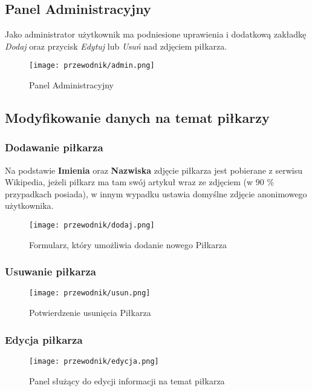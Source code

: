         \pagebreak

        \subsection{Panel Administracyjny}
            Jako administrator użytkownik ma podniesione uprawienia i dodatkową zakładkę \textit{Dodaj} oraz przycisk \textit{Edytuj} lub \textit{Usuń} nad zdjęciem piłkarza.

            \begin{figure}[!htb]
                \centering
                \texttt{[image: przewodnik/admin.png]}
                \caption{Panel Administracyjny}                
            \end{figure}

        \subsection{Modyfikowanie danych na temat piłkarzy}
                \subsubsection{Dodawanie piłkarza}
                 Na podstawie \textbf{Imienia} oraz \textbf{Nazwiska} zdjęcie piłkarza jest pobierane z serwisu Wikipedia, jeżeli piłkarz ma tam swój artykuł wraz ze zdjęciem (w 90 \% przypadkach posiada), w innym wypadku ustawia domyślne zdjęcie anonimowego użytkownika. 

                    \begin{figure}[!htb]
                        \centering
                        \texttt{[image: przewodnik/dodaj.png]}
                        \caption{Formularz, który umożliwia dodanie nowego Piłkarza}                
                    \end{figure}
                    \pagebreak
    
                \subsubsection{Usuwanie piłkarza}
                    \begin{figure}[!htb]
                        \centering
                        \texttt{[image: przewodnik/usun.png]}
                        \caption{Potwierdzenie usunięcia Piłkarza}                
                    \end{figure}
                    \pagebreak

                \subsubsection{Edycja piłkarza}

                    \begin{figure}[!htb]
                        \centering
                        \texttt{[image: przewodnik/edycja.png]}
                        \caption{Panel służący do edycji informacji na temat piłkarza}                
                    \end{figure}
 